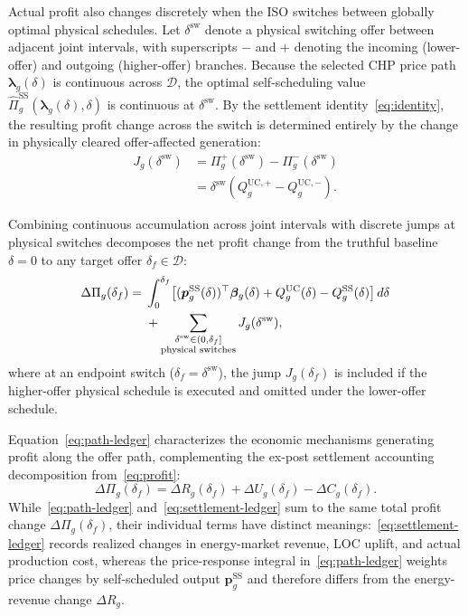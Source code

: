 \documentclass[journal]{IEEEtran}
\newcommand{\bp}{\bm p}
\newcommand{\blambda}{\bm\lambda}
\newcommand{\UC}{\mathrm{UC}}
\newcommand{\SSched}{\mathrm{SS}}
\begin{document}
Actual profit also changes discretely when the ISO switches between globally optimal physical schedules. Let $\delta^{\mathrm{sw}}$ denote a physical switching offer between adjacent joint intervals, with superscripts $-$ and $+$ denoting the incoming (lower-offer) and outgoing (higher-offer) branches. Because the selected CHP price path $\blambda_g(\delta)$ is continuous across $\mathcal{D}$, the optimal self-scheduling value $\widehat{\Pi}_g^{\SSched}(\blambda_g(\delta),\delta)$ is continuous at $\delta^{\mathrm{sw}}$. By the settlement identity~\eqref{eq:identity}, the resulting profit change across the switch is determined entirely by the change in physically cleared offer-affected generation:
\begin{equation}
\begin{aligned}
J_g(\delta^{\mathrm{sw}})
&= \Pi_g^+(\delta^{\mathrm{sw}}) - \Pi_g^-(\delta^{\mathrm{sw}})\\
&= \delta^{\mathrm{sw}}\!\left(Q_g^{\UC,+} - Q_g^{\UC,-}\right).
\end{aligned}
\label{eq:physical-jump}
\end{equation}

Combining continuous accumulation across joint intervals with discrete jumps at physical switches decomposes the net profit change from the truthful baseline $\delta=0$ to any target offer $\delta_f\in\mathcal{D}$:
\begin{align}
\Delta\Pi_g(\delta_f)
={}&\int_0^{\delta_f}\!
\left[
(\bp_g^{\SSched}(\delta))^\top\bm{\beta}_g(\delta)
+ Q_g^{\UC}(\delta) - Q_g^{\SSched}(\delta)
\right]d\delta\notag\\
&+ \sum_{\substack{\delta^{\mathrm{sw}}\in(0,\delta_f]\\\text{physical switches}}}
J_g(\delta^{\mathrm{sw}}),
\label{eq:path-ledger}
\end{align}
where at an endpoint switch ($\delta_f=\delta^{\mathrm{sw}}$), the jump $J_g(\delta_f)$ is included if the higher-offer physical schedule is executed and omitted under the lower-offer schedule.

Equation~\eqref{eq:path-ledger} characterizes the economic mechanisms generating profit along the offer path, complementing the ex-post settlement accounting decomposition from~\eqref{eq:profit}:
\begin{equation}
\Delta\Pi_g(\delta_f) = \Delta R_g(\delta_f) + \Delta U_g(\delta_f) - \Delta C_g(\delta_f).\label{eq:settlement-ledger}
\end{equation}
While~\eqref{eq:path-ledger} and~\eqref{eq:settlement-ledger} sum to the same total profit change $\Delta\Pi_g(\delta_f)$, their individual terms have distinct meanings:~\eqref{eq:settlement-ledger} records realized changes in energy-market revenue, LOC uplift, and actual production cost, whereas the price-response integral in~\eqref{eq:path-ledger} weights price changes by self-scheduled output $\bp_g^{\SSched}$ and therefore differs from the energy-revenue change $\Delta R_g$.
\end{document}

